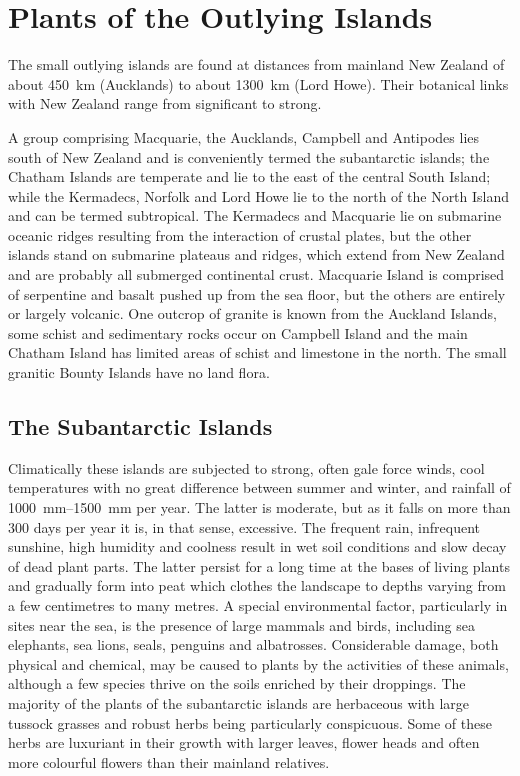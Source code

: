 \chapter{Plants of the Outlying Islands}%
\label{ch:outlyingislands}

The small outlying islands are found at distances from mainland New Zealand of about \SI{450}{\kilo\metre} (Aucklands) to about \SI{1300}{\kilo\metre} (Lord Howe).
Their botanical links with New Zealand range from significant to strong.

A group comprising Macquarie, the Aucklands, Campbell and Antipodes lies south of New Zealand and is conveniently termed the subantarctic islands; the Chatham Islands are temperate and lie to the east of the central South Island; while the Kermadecs, Norfolk and Lord Howe lie to the north of the North Island and can be termed subtropical.
The Kermadecs and Macquarie lie on submarine oceanic ridges resulting from the interaction of crustal plates, but the other islands stand on submarine plateaus and ridges, which extend from New Zealand and are probably all submerged continental crust.
Macquarie Island is comprised of serpentine and basalt pushed up from the sea floor, but the others are entirely or largely volcanic.
One outcrop of granite is known from the Auckland Islands, some schist and sedimentary rocks occur on Campbell Island and the main Chatham Island has limited areas of schist and limestone in the north.
The small granitic Bounty Islands have no land flora.

\section{The Subantarctic Islands}

Climatically these islands are subjected to strong, often gale force winds, cool temperatures with no great difference between summer and winter, and rainfall of \SIrange{1000}{1500}{\milli\metre} per year.
The latter is moderate, but as it falls on more than 300 days per year it is, in that sense, excessive.
The frequent rain, infrequent sunshine, high humidity and coolness result in wet soil conditions and slow decay of dead plant parts.
The latter persist for a long time at the bases of living plants and gradually form into peat which clothes the landscape to depths varying from a few centimetres to many metres.
A special environmental factor, particularly in sites near the sea, is the presence of large mammals and  birds, including sea elephants, sea lions, seals, penguins and albatrosses.
Considerable damage, both physical and chemical, may be caused to plants by the activities of these animals, although a few species thrive on the soils enriched by their droppings.
The majority of the plants of the subantarctic islands are herbaceous with large tussock grasses and robust herbs being particularly conspicuous.
Some of these herbs are luxuriant in their growth with larger leaves, flower heads and often more colourful flowers than their mainland relatives.

